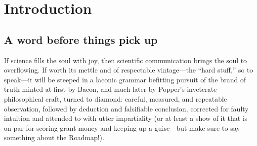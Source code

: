 
\chapter{Introduction}
\label{chp:intro}


\section{A word before things pick up}

If science fills the soul with joy, then scientific communication
brings the soul to overflowing. If worth its mettle and of respectable
vintage---the ``hard stuff,'' so to speak---it will be steeped in a
laconic grammar befitting pursuit of the brand of truth minted at
first by Bacon, and much later by Popper's inveterate philosophical
craft, turned to diamond: careful, measured, and repeatable
observation, followed by deduction and falsifiable conclusion,
corrected for faulty intuition and attended to with utter impartiality
(or at least a show of it that is on par for scoring grant money and
keeping up a guise---but make sure to say something about the
Roadmap!).

